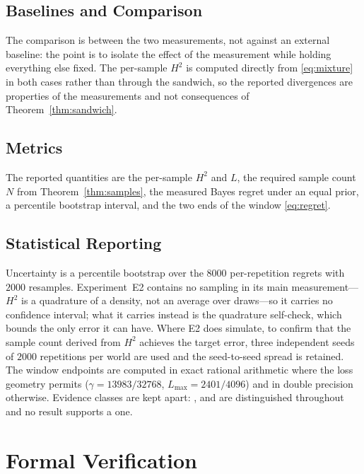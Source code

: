 \subsection{Baselines and Comparison}

The comparison is between the two measurements, not against an external baseline: the point
is to isolate the effect of the measurement while holding everything else fixed. The
per-sample $H^{2}$ is computed directly from \eqref{eq:mixture} in both cases rather than
through the sandwich, so the reported divergences are properties of the measurements and not
consequences of Theorem~\ref{thm:sandwich}.

\subsection{Metrics}

The reported quantities are the per-sample $H^{2}$ and $L$, the required sample count $N$
from Theorem~\ref{thm:samples}, the measured Bayes regret under an equal prior, a percentile
bootstrap interval, and the two ends of the window \eqref{eq:regret}.

\subsection{Statistical Reporting}

Uncertainty is a percentile bootstrap over the $8000$ per-repetition regrets with $2000$
resamples. Experiment~E2 contains no sampling in its main measurement---$H^{2}$ is a
quadrature of a density, not an average over draws---so it carries no confidence interval;
what it carries instead is the quadrature self-check, which bounds the only error it can have.
Where E2 does simulate, to confirm that the sample count derived from $H^{2}$ achieves the
target error, three independent seeds of $2000$ repetitions per world are used and the
seed-to-seed spread is retained. The window endpoints are computed in exact rational arithmetic where the loss
geometry permits ($\gamma=13983/32768$, $L_{\max}=2401/4096$) and in double precision
otherwise. Evidence classes are kept apart: \PROVED{}, \CERT{} and \NUM{} are distinguished
throughout and no \NUM{} result supports a \PROVED{} one.

\section{Formal Verification}
\label{sec:verification}

